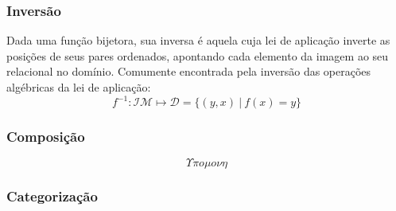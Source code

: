     \subsubsection{Inversão}
        Dada uma função bijetora, sua inversa é aquela cuja lei de aplicação inverte as posições de seus pares ordenados, apontando cada elemento da imagem ao seu relacional no domínio. Comumente encontrada pela inversão das operações algébricas da lei de aplicação:
        \[ f^{-1}: \mathcal{IM} \mapsto \mathcal{D} = \{(y,x) \ | \ f(x) = y\} \]
    \subsubsection{Composição}
        \[ \Upsilon \pi o \mu o \nu \eta \]
    \subsubsection{Categorização}
